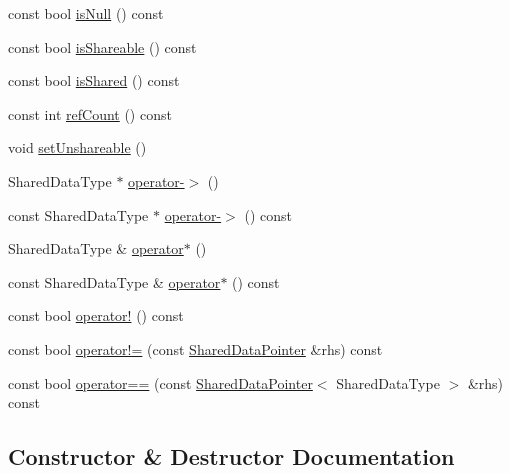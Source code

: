 \begin{DoxyCompactItemize}
const bool \hyperlink{classprism_1_1_shared_data_pointer_a2791e89091e965f1d06f2986ee05d810}{is\+Null} () const 
\item 
const bool \hyperlink{classprism_1_1_shared_data_pointer_a6b23c069510ae95130c6ecbca454b054}{is\+Shareable} () const 
\item 
const bool \hyperlink{classprism_1_1_shared_data_pointer_ace1d2a6b6563102b321f091729290f33}{is\+Shared} () const 
\item 
const int \hyperlink{classprism_1_1_shared_data_pointer_aec5ca29b4604c039d7fecdead3b03db4}{ref\+Count} () const 
\item 
void \hyperlink{classprism_1_1_shared_data_pointer_af2c4b48383be86e85cb46864ddae768f}{set\+Unshareable} ()
\item 
Shared\+Data\+Type $\ast$ \hyperlink{classprism_1_1_shared_data_pointer_acc512f07fead7332f920071177cad7bb}{operator-\/$>$} ()
\item 
const Shared\+Data\+Type $\ast$ \hyperlink{classprism_1_1_shared_data_pointer_ad107d76166d80cbcd3894533dc7b7be5}{operator-\/$>$} () const 
\item 
Shared\+Data\+Type \& \hyperlink{classprism_1_1_shared_data_pointer_a225343b932084283c498f666a10de3ec}{operator$\ast$} ()
\item 
const Shared\+Data\+Type \& \hyperlink{classprism_1_1_shared_data_pointer_adb8f9ef44184f78552bbfba9e55e7fc5}{operator$\ast$} () const 
\item 
const bool \hyperlink{classprism_1_1_shared_data_pointer_afdfedb3de13176fdc9d7bb8fce20ee9a}{operator!} () const 
\item 
const bool \hyperlink{classprism_1_1_shared_data_pointer_a1a793e8c8410d0a979b0269e071fa82a}{operator!=} (const \hyperlink{classprism_1_1_shared_data_pointer}{Shared\+Data\+Pointer} \&rhs) const 
\item 
const bool \hyperlink{classprism_1_1_shared_data_pointer_ab9603e8d447ca8968d06b29f056110f9}{operator==} (const \hyperlink{classprism_1_1_shared_data_pointer}{Shared\+Data\+Pointer}$<$ Shared\+Data\+Type $>$ \&rhs) const 
\end{DoxyCompactItemize}


\subsection{Constructor \& Destructor Documentation}
